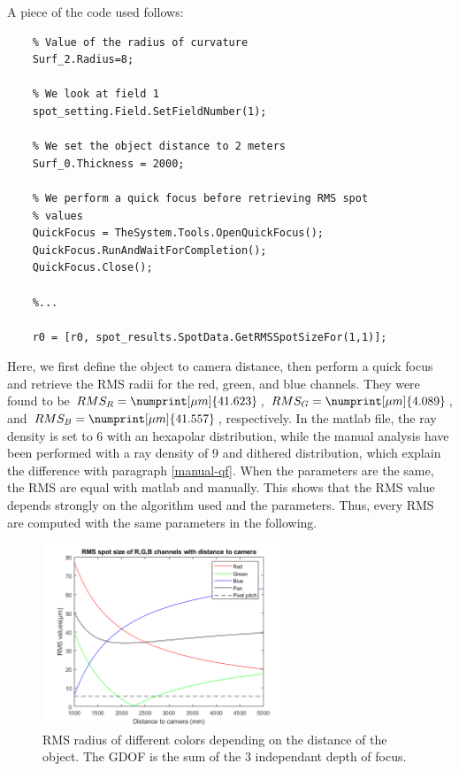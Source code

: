 \documentclass[10pt,letterpaper]{article}
\begin{document}
\pagebreak
A piece of the code used follows:

\begin{verbatim}
    % Value of the radius of curvature
    Surf_2.Radius=8;

    % We look at field 1
    spot_setting.Field.SetFieldNumber(1);

    % We set the object distance to 2 meters
    Surf_0.Thickness = 2000;

    % We perform a quick focus before retrieving RMS spot
    % values
    QuickFocus = TheSystem.Tools.OpenQuickFocus();
    QuickFocus.RunAndWaitForCompletion();
    QuickFocus.Close();

    %...

    r0 = [r0, spot_results.SpotData.GetRMSSpotSizeFor(1,1)];
\end{verbatim}

Here, we first define the object to camera distance, then perform a quick focus and retrieve the RMS radii for the red, green, and blue channels. They were found to be $RMS_R = \numprint[\mu m]{41.623}$, $RMS_G = \numprint[\mu m]{4.089}$, and $RMS_B = \numprint[\mu m]{41.557}$, respectively. In the matlab file, the ray density is set to 6 with an hexapolar distribution, while the manual analysis have been performed with a ray density of 9 and dithered distribution, which explain the difference with paragraph \ref{manual-qf}. When the parameters are the same, the RMS are equal with matlab and manually. This shows that the RMS value depends strongly on the algorithm used and the parameters. Thus, every RMS are computed with the same parameters in the following.

\begin{figure}[h]
    \centering
    \includegraphics[width=0.65\textwidth]{IO25_TP4_GDOF_init_2000_R8.png}
    \caption{RMS radius of different colors depending on the distance of the object. The GDOF is the sum of the 3 independant depth of focus.}
    \label{fig:gdof_init}
\end{figure}
\end{document}
